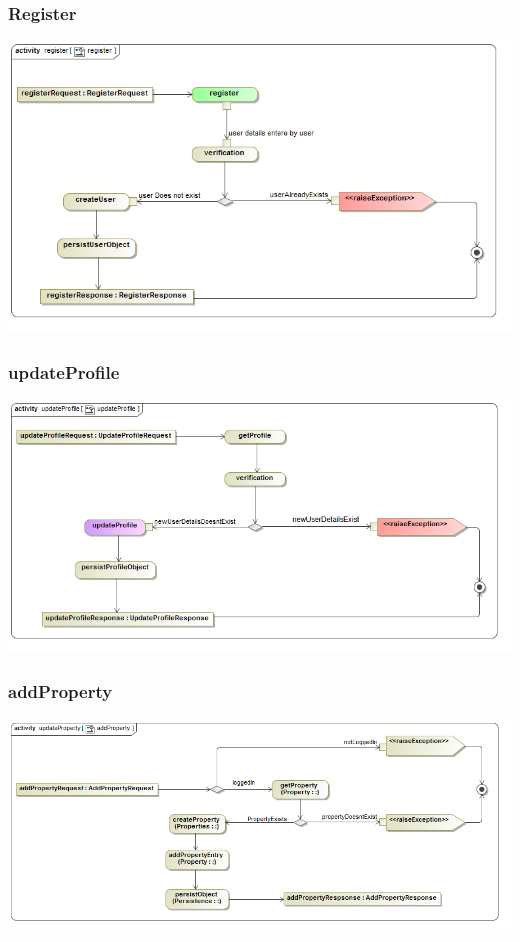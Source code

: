 \documentclass[a4paper,12pt]{article}
\begin{document}
\subsubsection{Register}
\includegraphics[width=1\textwidth]{./Images/newDiagrams/processSpecification/Diana/register.png}
\subsubsection{updateProfile}
\includegraphics[width=1\textwidth]{./Images/newDiagrams/processSpecification/Diana/updateProfile.png}

\subsubsection{addProperty}
\includegraphics[width=1\textwidth]{./Images/processSpecification/addProperty.png}
\end{document}
